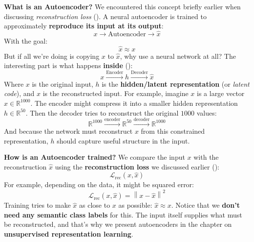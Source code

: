 \highspace
\textcolor{Green3}{ \textbf{What is an Autoencoder?}} We encountered this concept briefly earlier when discussing \emph{reconstruction loss} (). A neural autoencoder is trained to approximately \textbf{reproduce its input at its output}:
\begin{equation*}
    x \to \text{Autoencoder} \to \hat{x}
\end{equation*}
With the goal:
\begin{equation*}
    \hat{x} \approx x
\end{equation*}
But if all we're doing is copying $x$ to $\hat{x}$, why use a neural network at all? The interesting part is what happens \textbf{inside} ():
\begin{equation*}
    x \xrightarrow{\text{Encoder}} h \xrightarrow{\text{Decoder}} \hat{x}
\end{equation*}
Where $x$ is the original input, $h$ is the \textbf{hidden/latent representation} (or \emph{latent code}), and $\hat{x}$ is the reconstructed input. For example, imagine $x$ is a large vector $x \in \mathbb{R}^{1000}$. The encoder might compress it into a smaller hidden representation $h \in \mathbb{R}^{50}$. Then the decoder tries to reconstruct the original $1000$ values:
\begin{equation*}
    \mathbb{R}^{1000} \xrightarrow{\text{encoder}} \mathbb{R}^{50} \xrightarrow{\text{decoder}} \mathbb{R}^{1000}
\end{equation*}
And because the network must reconstruct $x$ from this constrained representation, $h$ should capture useful structure in the input.

\highspace
\textcolor{Green3}{ \textbf{How is an Autoencoder trained?}} We compare the input $x$ with the reconstruction $\hat{x}$ using the \textbf{reconstruction loss} we discussed earlier ():
\begin{equation*}
    \mathcal{L}_{\text{rec}}\left(x, \hat{x}\right)
\end{equation*}
For example, depending on the data, it might be squared error:
\begin{equation*}
    \mathcal{L}_{\text{rec}}\left(x, \hat{x}\right) = \left\|x - \hat{x}\right\|^2
\end{equation*}
Training tries to make $\hat{x}$ as close to $x$ as possible: $\hat{x} \approx x$. Notice that we \textbf{don't need any semantic class labels} for this. The input itself supplies what must be reconstructed, and that's why we present autoencoders in the chapter on \textbf{unsupervised representation learning}.

